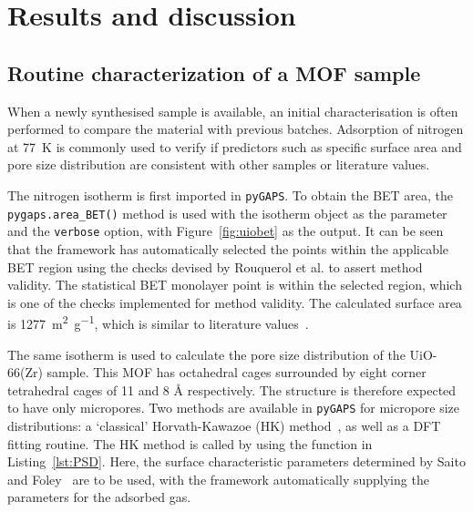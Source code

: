 
\section{Results and discussion}


\subsection{Routine characterization of a MOF sample}


When a newly synthesised sample is available, an initial characterisation is often performed
to compare the material with previous batches. Adsorption of nitrogen at \SI{77}{\kelvin}
is commonly used to verify if predictors such as specific surface area and pore size 
distribution are consistent with other samples or literature values. 

The nitrogen isotherm is first imported in \texttt{pyGAPS}. To obtain the BET 
area, the \lstinline{pygaps.area_BET()} method is used with the isotherm object as the 
parameter and the \lstinline{verbose} option, with Figure~\ref{fig:uiobet} as the output.
It can be seen that the framework has automatically selected the points within the 
applicable BET region using the checks devised by Rouquerol et al.
\cite{rouquerolAdsorptionPowdersPorous2013} to assert method validity. 
The statistical BET monolayer point is within
the selected region, which is one of the checks implemented for method validity.
The calculated surface area is \SI{1277}{\metre^2\per\gram}, which is similar to
literature values~\cite{wiersumEvaluationUiO66GasBased2011, 
valenzanoDisclosingComplexStructure2011}.


The same isotherm is used to calculate the pore size distribution of the UiO-66(Zr) sample.
This MOF has octahedral cages surrounded by eight corner 
tetrahedral cages of 11 and 8 \si{\angstrom} respectively. 
The structure is therefore expected to have only 
micropores. Two methods are available in \texttt{pyGAPS} for micropore size distributions:
a `classical' Horvath-Kawazoe (HK) method~\cite{horvathMethodCalculationEffective1983}, 
as well as a DFT fitting routine.
The HK method is called by using the function in Listing~\ref{lst:PSD}.
Here, the surface characteristic parameters determined by Saito and 
Foley~\cite{saitoCurvatureParametricSensitivity1991} are to
be used, with the framework automatically supplying the parameters for the adsorbed gas. 

